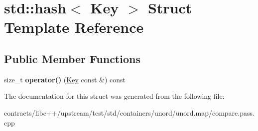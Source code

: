 \hypertarget{structstd_1_1hash_3_01_key_01_4}{}\section{std\+:\+:hash$<$ Key $>$ Struct Template Reference}
\label{structstd_1_1hash_3_01_key_01_4}
\subsection*{Public Member Functions}
\begin{DoxyCompactItemize}
\item 
\mbox{\label{structstd_1_1hash_3_01_key_01_4_aad6278cd0ebae8a5e4e44a0901e5834c}} 
size\+\_\+t {\bfseries operator()} (\mbox{\hyperlink{struct_key}{Key}} const \&) const
\end{DoxyCompactItemize}


The documentation for this struct was generated from the following file\+:\begin{DoxyCompactItemize}
\item 
contracts/libc++/upstream/test/std/containers/unord/unord.\+map/compare.\+pass.\+cpp\end{DoxyCompactItemize}
